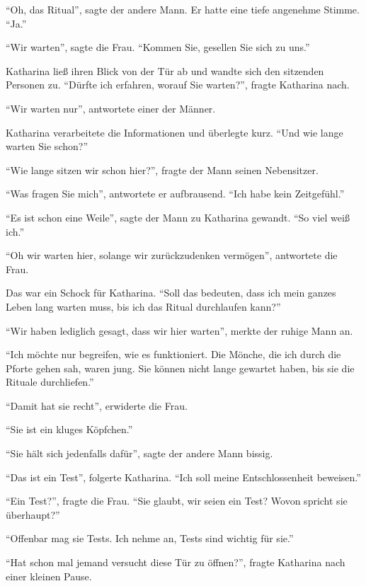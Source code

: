 \enquote{Oh, das Ritual}, sagte der andere Mann. Er hatte eine tiefe angenehme Stimme. \enquote{Ja.}

\enquote{Wir warten}, sagte die Frau. \enquote{Kommen Sie, gesellen Sie sich zu uns.}

Katharina ließ ihren Blick von der Tür ab und wandte sich den sitzenden Personen zu. \enquote{Dürfte ich erfahren, worauf Sie warten?}, fragte Katharina nach.

\enquote{Wir warten nur}, antwortete einer der Männer.

Katharina verarbeitete die Informationen und überlegte kurz. \enquote{Und wie lange warten Sie schon?}

\enquote{Wie lange sitzen wir schon hier?}, fragte der Mann seinen Nebensitzer.

\enquote{Was fragen Sie mich}, antwortete er aufbrausend. \enquote{Ich habe kein Zeitgefühl.}

\enquote{Es ist schon eine Weile}, sagte der Mann zu Katharina gewandt. \enquote{So viel weiß ich.}

\enquote{Oh wir warten hier, solange wir zurückzudenken vermögen}, antwortete die Frau.

Das war ein Schock für Katharina. \enquote{Soll das bedeuten, dass ich mein ganzes Leben lang warten muss, bis ich das Ritual durchlaufen kann?}

\enquote{Wir haben lediglich gesagt, dass wir hier warten}, merkte der ruhige Mann an.

\enquote{Ich möchte nur begreifen, wie es funktioniert. Die Mönche, die ich durch die Pforte gehen sah, waren jung. Sie können nicht lange gewartet haben, bis sie die Rituale durchliefen.}

\enquote{Damit hat sie recht}, erwiderte die Frau.

\enquote{Sie ist ein kluges Köpfchen.}

\enquote{Sie hält sich jedenfalls dafür}, sagte der andere Mann bissig.

\enquote{Das ist ein Test}, folgerte Katharina. \enquote{Ich soll meine Entschlossenheit beweisen.}

\enquote{Ein Test?}, fragte die Frau. \enquote{Sie glaubt, wir seien ein Test? Wovon spricht sie überhaupt?}

\enquote{Offenbar mag sie Tests. Ich nehme an, Tests sind wichtig für sie.}

\enquote{Hat schon mal jemand versucht diese Tür zu öffnen?}, fragte Katharina nach einer kleinen Pause.

